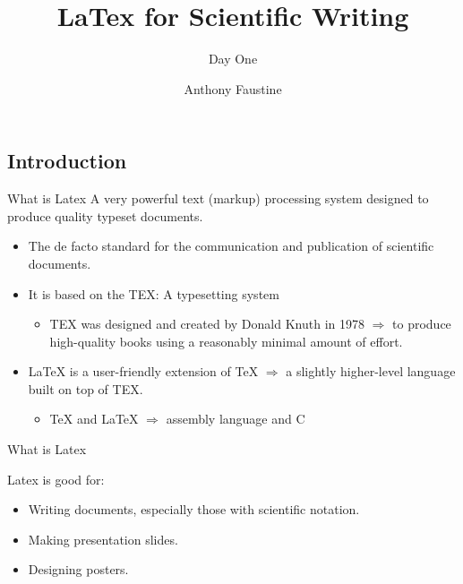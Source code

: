 \documentclass{beamer}
\title{LaTex for Scientific Writing} %
\subtitle{Day One} %
\author{Anthony Faustine}
\begin{document}
  \frame{\maketitle}


  \begin{darkframes}
    
\section{Introduction}
  \begin{frame}[<+->]{What is Latex}
  	A very powerful text (markup) processing system designed to produce quality typeset
  	documents.
  	\begin{itemize}
  		\item The de facto standard for the communication and publication of scientific documents.
  		\item It is based on the TEX: A typesetting system
  		\begin{itemize}
  			\item TEX was designed and created by Donald Knuth in 1978 $\Rightarrow$ to produce high-quality books using a
  			reasonably minimal amount of effort.
  		\end{itemize}
  		\item LaTeX is a user-friendly extension of TeX $\Rightarrow$  a slightly higher-level language built on top of TEX.
  		\begin{itemize}
  			\item TeX and LaTeX $\Rightarrow$ assembly language and C
  		\end{itemize}
  		
  	\end{itemize}
  \end{frame} 

   \begin{frame}[<+->]{What is Latex}
   	
   	\begin{block}{Latex is good for:}
   		\begin{itemize}
   			\item Writing documents, especially those with scientific notation.
   			\item Making presentation slides.
   			\item Designing posters.
   		\end{itemize}
   	\end{block}
   \end{frame}
   

\end{darkframes}
\end{document}
